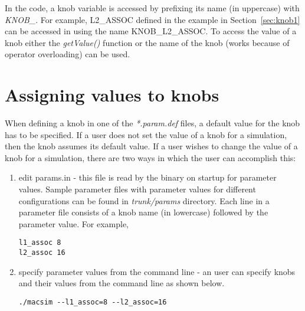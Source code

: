 In the \SIM code, a knob variable is accessed by prefixing its name (in
uppercase) with \textit{KNOB\_}.  For example, L2\_ASSOC defined in the example
in Section~\ref{sec:knob1} can be accessed in \SIM using the name
KNOB\_L2\_ASSOC.  To access the value of a knob either the \textit{getValue()}
function or the name of the knob (works because of operator overloading) can be
used.




\section{Assigning values to knobs}

When defining a knob in one of the \textit{*.param.def} files, a default value
for the knob has to be specified. If a user does not set the value of a knob
for a simulation, then the knob assumes its default value. If a user wishes to
change the value of a knob for a simulation, there are two ways in which the
user can accomplish this:



\begin{enumerate}

  \item edit params.in - this file is read by the \SIM binary on startup for
  parameter values.  Sample parameter files with parameter values for different
  configurations can be found in \textit{trunk/params} directory. Each line in
a parameter file consists of a knob name (in lowercase) followed by the
parameter value. For example,

\begin{Verbatim}
l1_assoc 8
l2_assoc 16
\end{Verbatim}


  \item specify parameter values from the command line - an user can specify
  knobs and their values from the command line as shown below.

\begin{Verbatim}
./macsim --l1_assoc=8 --l2_assoc=16
\end{Verbatim}

\end{enumerate}

